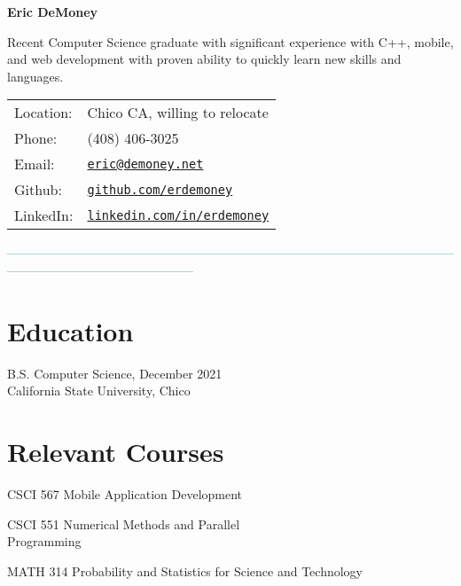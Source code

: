 \documentclass[letterpaper]{article}
\def\name{Eric DeMoney}
\renewenvironment{itemize}{
  \begin{list}{}{
    \setlength{\leftmargin}{1.5em}
  }
}{
  \end{list}
}
\begin{document}
{\textbf{\huge \name}

\vspace{0.05in}

\begin{minipage}{0.475\linewidth}
   Recent Computer Science graduate with significant experience with C++, mobile, and web development with proven ability to quickly learn new skills and\\languages. 
\end{minipage}
\hspace{0.125cm}
\begin{minipage}{0.475\linewidth}
  \begin{tabular}{ll}
    Location: & Chico CA, willing to relocate\\
    Phone: & (408) 406-3025\\
    Email: & \href{mailto:eric@demoney.net}{\tt eric@demoney.net}\\
    Github: & \href{https://github.com/erdemoney}{\tt github.com/erdemoney}\\
    LinkedIn: & \href{https://linkedin.com/in/erdemoney}{\tt linkedin.com/in/erdemoney}\\
  \end{tabular}
\end{minipage}

\vspace{0.1in}
\textcolor{teal}{---------------------------------------------------------------------------------------------------------------------------------------------------------}
\vspace{0.1in}

\begin{minipage}[t]{0.475\linewidth}
    \section*{Education}
    \begin{itemize}
    \item[$\bullet$] B.S. Computer Science, December 2021\\
        California State University, Chico
    \end{itemize}
    \section*{Relevant Courses}
    \begin{itemize}
        \item[$\bullet$] CSCI 567 Mobile Application Development
        \item[$\bullet$] CSCI 551 Numerical Methods and Parallel\\Programming
        \item[$\bullet$] MATH 314 Probability and Statistics for Science and Technology
    \end{itemize}
\end{minipage}
\hspace{0.5cm}
\begin{minipage}[t]{0.475\linewidth}

\end{minipage}}
\end{document}
